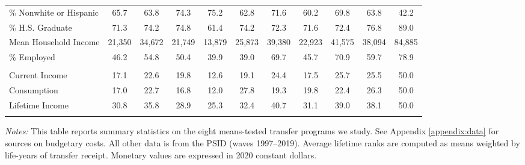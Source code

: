 \begin{table}[t!]
\begin{tabular*}{1.36\textwidth}{@{\extracolsep{\fill}}lcccccccccc@{}}
\quad \% Nonwhite or Hispanic                &    65.7     &   63.8       &    74.3                &  75.2    &  62.8    &  71.6   &  60.2      &    69.8   & 63.8  & 42.2        \\
\quad \% H.S. Graduate                       &     71.3     &   74.2       &    74.8                &  61.4    &  74.2    &  72.3   &  71.6      &    72.4   & 76.8  & 89.0        \\
\quad Mean Household Income                         &     21,350     &   34,672       &    21,749                &  13,879    &  25,873    &  39,380   &  22,923      &    41,575   & 38,094  & 84,885        \\
\quad \% Employed                            &    46.2     &   54.8       &    50.4                &  39.9    &  39.0    &  69.7   &  45.7      &    70.9   & 59.7  & 78.9        \\ \addlinespace
\multicolumn{6}{@{}l}{Mean Rank, Equivalized  Households}                \\
\quad Current Income                         &   17.1     &   22.6       &    19.8                &  12.6    &  19.1    &  24.4   &  17.5      &    25.7   & 25.5  & 50.0        \\ 
\quad Consumption                            &    17.0     &   22.7       &    16.8                &  12.0    &  27.8    &  19.3   &  19.8      &    22.4   & 26.3  & 50.0        \\ 
\quad Lifetime Income                        &    30.8     &   35.8       &    28.9                &  25.3    &  32.4    &  40.7   &  31.1      &    39.0   & 38.1  & 50.0        \\  \addlinespace \bottomrule
 \end{tabular*}
                                            \begin{spacing}{1}
                                                \begin{tablenotes}
                                                      \item \footnotesize \textit{Notes:} This table reports summary statistics on the eight means-tested transfer programs we study. See Appendix \ref{appendix:data} for sources on budgetary costs. All other data is from the PSID (waves 1997--2019). Average lifetime ranks are computed as means weighted by life-years of transfer receipt. Monetary values are expressed in 2020 constant dollars.
                                                      \end{tablenotes}
                                                       \end{spacing}
                                                \end{table}